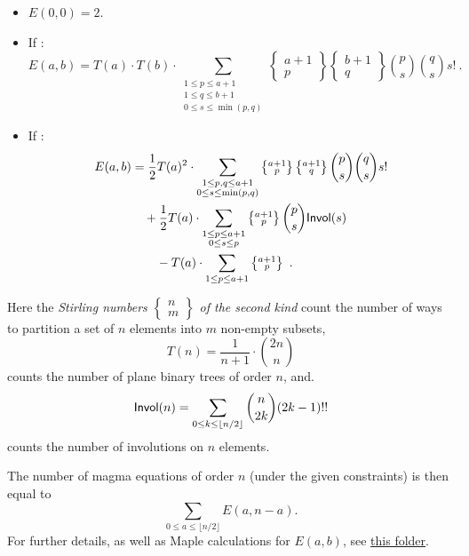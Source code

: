 \begin{itemize}
\item $E(0,0) = 2$.
\item  If :
$$
E(a,b) = T(a)\cdot T(b) \cdot \sum_{\substack{1 \le p \le a+1\\ 1 \le q \le b+1\\0\le s \le \min(p,q)}}
\left\{\substack{a+1\\p}\right\} \left\{\substack{b+1\\q}\right\} \binom{p}{s} \binom{q}{s} s! \ .
$$
\item If :
\begin{align*}
E(a,b) &= \frac{1}{2} T(a)^2\cdot \sum_{\substack{1 \le p,q \le a+1\\ 0\le s \le \min(p,q)}}
\left\{\substack{a+1\\p}\right\} \left\{\substack{a+1\\q}\right\}\binom{p}{s} \binom{q}{s} s! \\
&\quad + \frac{1}{2} T(a) \cdot \sum_{\substack{1 \le p \le a+1\\ 0\le s \le p}}
\left\{\substack{a+1\\p}\right\}  \binom{p}{s} {\sf Invol}(s)\\
&\qquad - T(a)\cdot \sum_{1\le p \le a+1}  \left\{\substack{a+1\\p}\right\} \ .
\end{align*}
\end{itemize}

Here the {\it Stirling numbers $\left\{\substack{n\\m}\right\}$ of the second kind} count the number of ways to partition a set of $n$ elements into $m$ non-empty subsets,
$$
T(n) = \frac{1}{n+1} \cdot \binom{2n}{n}
$$
counts the number of plane binary trees of order $n$, and.
$$
{\sf Invol}(n) = \sum_{0 \leq k \leq \lfloor n/2 \rfloor}  \binom{n}{2k} (2k-1)!!
$$
counts the number of involutions on $n$ elements.

The number of magma equations of order $n$ (under the given constraints) is then equal to
$$\sum_{0 \le a \le \lfloor n/2 \rfloor } E(a,n-a) .
$$
For further details, as well as Maple calculations for $E(a,b)$, see \href{https://github.com/teorth/equational_theories/tree/main/scripts/count_magma_eqns}{this folder}.
